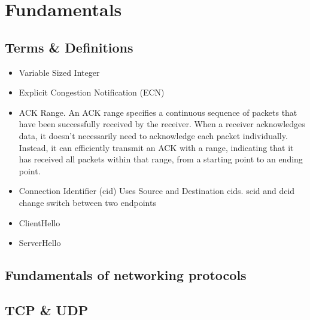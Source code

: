 \chapter{Fundamentals}

\section{Terms \& Definitions}

\begin{itemize}
 \item Variable Sized Integer \label{variable_sized_integer}
 \item Explicit Congestion Notification (ECN) \label{ecn}
 \item ACK Range. An ACK range specifies a continuous sequence of packets that have been successfully received by the receiver. When a receiver acknowledges data, it doesn't necessarily need to acknowledge each packet individually. Instead, it can efficiently transmit an ACK with a range, indicating that it has received all packets within that range, from a starting point to an ending point. \label{ack_range}
 \item Connection Identifier (cid) Uses Source and Destination cids. scid and dcid change switch between two endpoints\label{cid}
 \item ClientHello
 \item ServerHello
\end{itemize}

\section{Fundamentals of networking protocols}

\section{TCP \& UDP}